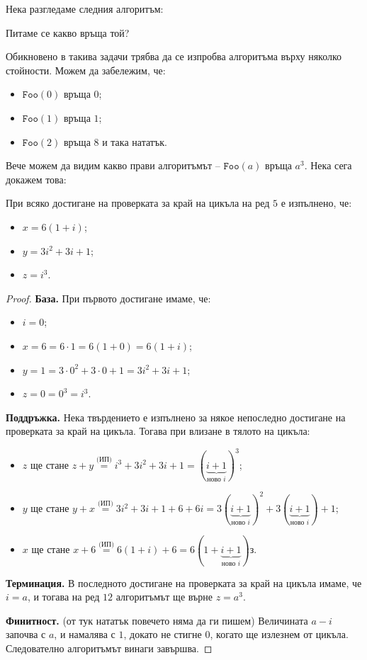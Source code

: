Нека разгледаме следния алгоритъм:

Питаме се какво връща той?

Обикновено в такива задачи трябва да се изпробва алгоритъма върху няколко стойности.
Можем да забележим, че:
\begin{itemize}
    \item $\mathtt{Foo}(0)$ връща $0$;
    \item $\mathtt{Foo}(1)$ връща $1$;
    \item $\mathtt{Foo}(2)$ връща $8$ и така нататък.
\end{itemize}

Вече можем да видим какво прави алгоритъмът -- $\mathtt{Foo}(a)$ връща $a^3$.
Нека сега докажем това:
\begin{invariant}
    При всяко достигане на проверката за край на цикъла на ред $5$ е изпълнено, че:
    \begin{itemize}
        \item $x = 6 (1 + i)$;
        \item $y = 3i^2 + 3i + 1$;
        \item $z = i^3$.
    \end{itemize}
\end{invariant}
\begin{proof}
    \phantom{1}

    \textbf{База.}
    При първото достигане имаме, че:
    \begin{itemize}
        \item $i = 0$;
        \item $x = 6 = 6 \cdot 1 = 6 (1 + 0) = 6 (1 + i)$;
        \item $y = 1 = 3 \cdot 0^2 + 3 \cdot 0 + 1 = 3i^2 + 3i + 1$;
        \item $z = 0 = 0^3 = i^3$.
    \end{itemize}

    \textbf{Поддръжка.}
    Нека твърдението е изпълнено за някое непоследно достигане на проверката за край на цикъла.
    Тогава при влизане в тялото на цикъла:
    \begin{itemize}
        \item $z$ ще стане $z + y \stackrel{\text{(ИП)}}{=} i^3 + 3i^2 + 3i + 1 = (\underbrace{i + 1}_{\text{ново } i})^3$;
        \item $y$ ще стане $y + x \stackrel{\text{(ИП)}}{=} 3i^2 + 3i + 1 + 6 + 6i = 3(\underbrace{i + 1}_{\text{ново } i})^2 + 3(\underbrace{i + 1}_{\text{ново } i}) + 1$;
        \item $x$ ще стане $x + 6 \stackrel{\text{(ИП)}}{=} 6(1 + i) + 6 = 6(1 + \underbrace{i + 1}_{\text{ново } i})з$.
    \end{itemize}

    \textbf{Терминация.}
    В последното достигане на проверката за край на цикъла имаме, че $i = a$, и тогава на ред $12$ алгоритъмът ще върне $z = a^3$.

    \textbf{Финитност.} (от тук нататък повечето няма да ги пишем)
    Величината $a - i$ започва с $a$, и намалява с $1$, докато не стигне $0$, когато ще излезнем от цикъла.
    Следователно алгоритъмът винаги завършва.
\end{proof}

